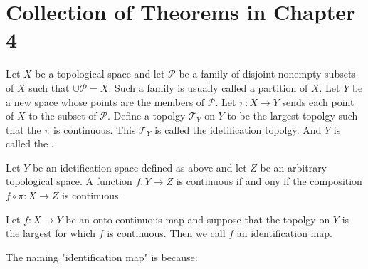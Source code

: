 \documentclass{article}
\begin{document}
\section{Collection of Theorems in Chapter 4}
\label{sec:Collection-of-Theorems-in-Chapter-4}
\begin{defi}
Let $X$ be a topological space and let $\mathscr{P}$ be a family of
disjoint nonempty subsets of $X$ such that $\cup \mathscr{P}=X$. Such
a family is usually called a partition of $X$. Let $Y$ be a new space
whose points are the members of $\mathscr{P}$. Let $\pi:X\to Y$ sends
each point of $X$ to the subset of $\mathscr{P}$. Define a topolgy
$\mathcal{T}_Y$ on $Y$ to be the largest topolgy such that the $\pi$
is continuous. This $\mathcal{T}_Y$ is called the idetification topolgy.
And $Y$ is called the .
\end{defi}
\begin{center}  \end{center}
\begin{thm}
    Let $Y$ be an idetification space defined as above and let $Z$ be
    an arbitrary topological space. A function $f:Y\to Z$ is
    continuous if and ony if the composition $f\circ \pi:X\to Z$ is
    continuous.
\end{thm}
\begin{center}  \end{center}
\begin{defi}
    Let $f:X\to Y$ be an onto continuous map and suppose that the topolgy on $Y$
    is the largest for which $f$ is continuous. Then we call $f$ an
    identification map.
\end{defi}
The naming "identification map" is because:
\end{document}
